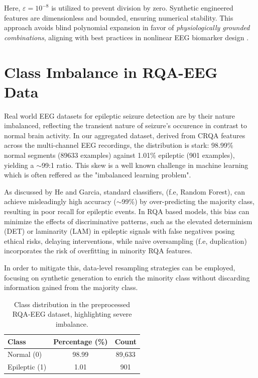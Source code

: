 \documentclass{article}
\begin{document}
				Here, $\varepsilon = 10^{-8}$ is utilized to prevent division by zero. 
				Synthetic engineered features are dimensionless and 
				bounded, ensuring numerical stability. 
				This approach avoids blind polynomial expansion in 
				favor of \textit{physiologically grounded combinations}, 
				aligning with best practices in nonlinear EEG biomarker design \cite{faes2014information, zhang2020cross}.



				\section{Class Imbalance in RQA-EEG Data}

				Real world EEG datasets for epileptic seizure detection are by their nature imbalanced, 
				reflecting the transient nature of seizure's occurence in contrast to normal brain activity. 
				In our aggregated dataset, derived from CRQA features across the multi-channel EEG recordings,
				the distribution is stark: 98.99\% normal segments (89633 examples) against 1.01\% epileptic (901 examples), 
				yielding a $\sim$99:1 ratio. This skew is a well known challenge in machine 
				learning which is often reffered as the "imbalanced learning problem".

				As discussed by He and Garcia\cite{he2009}, standard classifiers, (f.e, Random Forest), 
				can achieve misleadingly high accuracy ($\sim$99\%) 
				by over-predicting the majority class, resulting in poor recall for epileptic events.
				In RQA based models, this bias can minimize the effects of discriminative patterns, 
				such as the elevated determinism (DET) or laminarity (LAM) in epileptic signals with 
				false negatives posing ethical risks, delaying interventions, while naive oversampling 
				(f.e, duplication) incorporates the risk of overfitting in minority RQA features.

				In order to mitigate this, data-level resampling strategies can be employed, focusing on 
				synthetic generation to enrich the minority class without discarding information gained from
				the majority class. 

				\begin{table}[h]
				\centering
				\caption{Class distribution in the preprocessed RQA-EEG dataset, highlighting severe imbalance.}
				\label{tab:imbalance}
				\begin{tabular}{lcc}
				\toprule
				Class & Percentage (\%) & Count \\
				\midrule
				Normal (0) & 98.99 & 89,633\\
				Epileptic (1) & 1.01 & 901 \\
				\bottomrule
				\end{tabular}
				\end{table}
				
\end{document}
